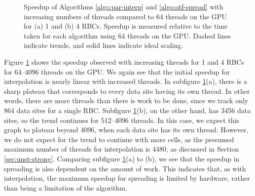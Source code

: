 \begin{figure}[ht]
\caption{%
    Speedup of Algorithms \ref{algo:par-interp} and \ref{algo:otf-spread} with
    increasing numbers of threads compared to 64 threads on the GPU for (a) 1
    and (b) 4 RBCs. Speedup is measured relative to the time taken for each
    algorithm using 64 threads on the GPU. Dashed lines indicate trends, and
    solid lines indicate ideal scaling.
}
\label{fig:str-strong}
\end{figure}

Figure \ref{fig:str-strong} shows the speedup observed with increasing threads
for 1 and 4 RBCs for 64--4096 threads on the GPU. We again see that the initial
speedup for interpolation is nearly linear with increased threads. In subfigure
\ref{fig:str-strong}(a), there is a sharp plateau that corresponds to every
data site having its own thread. In other words, there are more threads than
there is work to be done, since we track only 864 data sites for a single RBC.
Subfigure \ref{fig:str-strong}(b), on the other hand, has 3456 data sites, so
the trend continues for 512--4096 threads. In this case, we expect this graph
to plateau beyond 4096, when each data site has its own thread. However, we do
not expect for the trend to continue with more cells, as the presumed maximum
number of threads for interpolation is 4480, as discussed in Section
\ref{sec:unst-strong}. Comparing subfigure \ref{fig:str-strong}(a)
to (b), we see that the speedup in spreading is also dependent on the amount of
work. This indicates that, as with interpolation, the maximum speedup for
spreading is limited by hardware, rather than being a limitation of the
algorithm.

